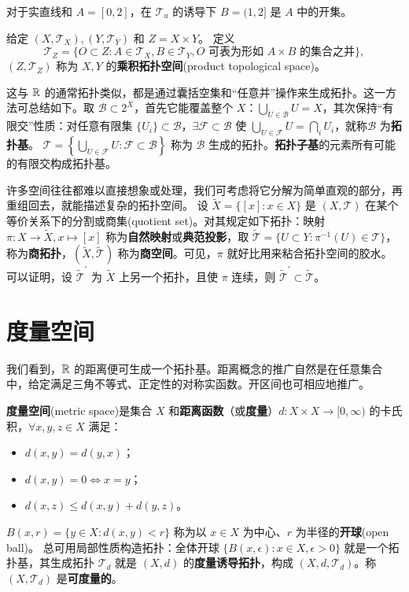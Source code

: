 \begin{eg}
    对于实直线和 $A=[0,2]$，在 $\mathscr T_u$ 的诱导下 $B=(1,2]$ 是 $A$ 中的开集。
\end{eg}

\begin{definition}
    给定 $(X,\mathscr T_X),(Y,\mathscr T_Y)$ 和 $Z=X \times Y$。
    定义
    \[\mathscr T_Z=\{O\subset Z:A\in\mathscr T_X,B\in\mathscr T_Y,\text{$O$ 可表为形如 $A\times B$ 的集合之并}\},\]
    $(Z,\mathscr T_Z)$ 称为 $X,Y$ 的\textbf{乘积拓扑空间}(product topological space)。
\end{definition}

这与 $\mathbb{R}$ 的通常拓扑类似，都是通过囊括空集和“任意并”操作来生成拓扑。这一方法可总结如下。取 $\mathscr{B} \subset 2^X$，首先它能覆盖整个 $X$：$\bigcup_{U\in\mathscr{B}}U=X$，其次保持“有限交”性质：对任意有限集 $\{U_i\}\subset\mathscr{B}$，$\exists\mathscr{F}\subset \mathscr{B}$ 使 $\bigcup_{U\in\mathscr{F}}U=\bigcap_{i} U_i$，就称$\mathscr{B}$ 为\textbf{拓扑基}。
$\mathscr{T}=\left\{\bigcup_{U\in\mathscr{F}}U:\mathscr{F}\subset\mathscr{B}\right\}$ 称为 $\mathscr{B}$ 生成的拓扑。\textbf{拓扑子基}的元素所有可能的有限交构成拓扑基。

许多空间往往都难以直接想象或处理，我们可考虑将它分解为简单直观的部分，再重组回去，就能描述复杂的拓扑空间。
设 $\tilde X=\{[x]:x\in X\}$ 是 $(X,\mathscr T)$ 在某个等价关系下的分割或商集(quotient set)。对其规定如下拓扑：映射 $\pi: X \to \tilde X,x\mapsto [x]$ 称为\textbf{自然映射}或\textbf{典范投影}，取 $\tilde{\mathscr T}=\{U \subset Y:\pi^{-1}(U)\in\mathscr T\}$，称为\textbf{商拓扑}，$(\tilde X,\tilde{\mathscr T})$ 称为\textbf{商空间}。可见，$\pi$ 就好比用来粘合拓扑空间的胶水。
可以证明，设 $\tilde{\mathscr T}^{\prime}$ 为 $\tilde X$ 上另一个拓扑，且使 $\pi$ 连续，则 $\tilde{\mathscr T}^{\prime} \subset \tilde{\mathscr T}$。

\section{度量空间}

我们看到，$\mathbb{R}$ 的距离便可生成一个拓扑基。距离概念的推广自然是在任意集合中，给定满足三角不等式、正定性的对称实函数。开区间也可相应地推广。

\begin{definition}
    \textbf{度量空间}(metric space)是集合 $X$ 和\textbf{距离函数}（或\textbf{度量}）$d: X \times X \to [0,\infty)$ 的卡氏积，$\forall x,y,z\in X$ 满足：
    \begin{itemize}
        \item $d(x,y)=d(y,x)$；
        \item $d(x,y) = 0\iff x=y$；
        \item $d(x,z) \leqslant d(x,y)+d(y,z)$。
    \end{itemize}
    $B(x,r)=\{y \in X: d(x, y)<r\}$ 称为以 $x \in X$ 为中心、$r$ 为半径的\textbf{开球}(open ball)。
    总可用局部性质构造拓扑：全体开球 $\{B(x,\epsilon):x\in X,\epsilon >0\}$ 就是一个拓扑基，其生成拓扑 $\mathscr T_d$ 就是 $(X,d)$ 的\textbf{度量诱导拓扑}，构成 $(X,d,\mathscr T_d)$。称 $(X,\mathscr T_d)$ 是\textbf{可度量的}。
\end{definition}

